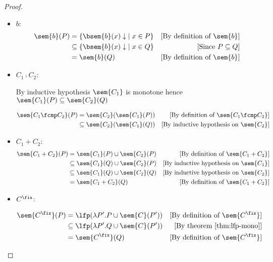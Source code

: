 \begin{definition}
\begin{proof}
\begin{itemize}
      \item $b$:
        \begin{align*}
          \sem{b}(P) 
            &= \{ \bsem{b}(x)\downarrow \; \mid x \in P \} 
            & \text{[By definition of $\sem{b}$]}\\
            &\subseteq \{ \bsem{b}(x)\downarrow \; \mid x \in Q \} 
            & \text{[Since $P \subseteq Q$]}\\
            &= \sem{b}(Q) 
            & \text{[By definition of $\sem{b}$]}\\
        \end{align*}

      \item $C_1 \fcmp C_2$:

        By inductive hypothesis $\sem{C_1}$ is monotone hence
        $\sem{C_1}(P) \subseteq \sem{C_2}(Q)$

        \begin{align*}
          \sem{C_1 \fcmp C_2}(P) 
            &= \sem{C_2}(\sem{C_1}(P))
            &\text{[By definition of $\sem{C_1 \fcmp C_2}$]}\\
            &\subseteq \sem{C_2}(\sem{C_1}(Q))
            &\text{[By inductive hypothesis on $\sem{C_2}$]} \\
        \end{align*}
    
      \item $C_1 + C_2$:
        \begin{align*}
          \sem{C_1 + C_2}(P) 
            &= \sem{C_1}(P) \cup \sem{C_2}(P)
            &\text{[By definition of $\sem{C_1 + C_2}$]}\\
            &\subseteq \sem{C_1}(Q) \cup \sem{C_2}(P)
            &\text{[By inductive hypothesis on $\sem{C_1}$]} \\
            &\subseteq \sem{C_1}(Q) \cup \sem{C_2}(Q)
            &\text{[By inductive hypothesis on $\sem{C_2}$]} \\
            &= \sem{C_1 + C_2}(Q) 
            &\text{[By definition of $\sem{C_1 + C_2}$]}\\
        \end{align*}
      
      \item $C^\fix$:

        \begin{align*}
          \sem{C^\fix}(P) 
            &= \lfp(\lambda P'. P \cup \sem{C}(P'))
            &\text{[By definition of $\sem{C^\fix}$]}\\
            &\subseteq \lfp(\lambda P'. Q \cup \sem{C}(P'))
            &\text{[By theorem \ref{thm:lfp-mono}]}\\
            &= \sem{C^\fix}(Q) 
            &\text{[By definition of $\sem{C^\fix}$]}\\
        \end{align*}
        

\end{itemize}
\end{proof}
\end{definition}
